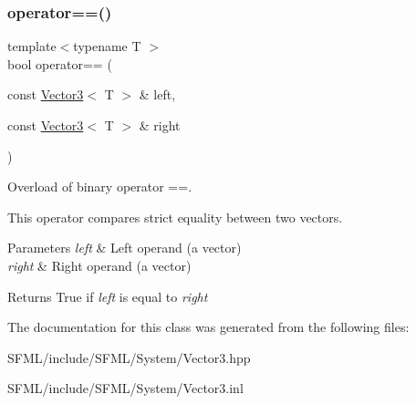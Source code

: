 \subsubsection{\texorpdfstring{operator==()}{operator==()}}
{\footnotesize\ttfamily template$<$typename T $>$ \\
bool operator== (\begin{DoxyParamCaption}\item[{const \mbox{\hyperlink{classsf_1_1_vector3}{Vector3}}$<$ T $>$ \&}]{left,  }\item[{const \mbox{\hyperlink{classsf_1_1_vector3}{Vector3}}$<$ T $>$ \&}]{right }\end{DoxyParamCaption})\hspace{0.3cm}{\ttfamily [related]}}



Overload of binary operator ==. 

This operator compares strict equality between two vectors.


\begin{DoxyParams}{Parameters}
{\em left} & Left operand (a vector) \\
\hline
{\em right} & Right operand (a vector)\\
\hline
\end{DoxyParams}
\begin{DoxyReturn}{Returns}
True if {\itshape left} is equal to {\itshape right} \begin{DoxyVerb}\end{DoxyVerb}
 
\end{DoxyReturn}


The documentation for this class was generated from the following files\+:\begin{DoxyCompactItemize}
\item 
S\+F\+M\+L/include/\+S\+F\+M\+L/\+System/Vector3.\+hpp\item 
S\+F\+M\+L/include/\+S\+F\+M\+L/\+System/Vector3.\+inl\end{DoxyCompactItemize}
